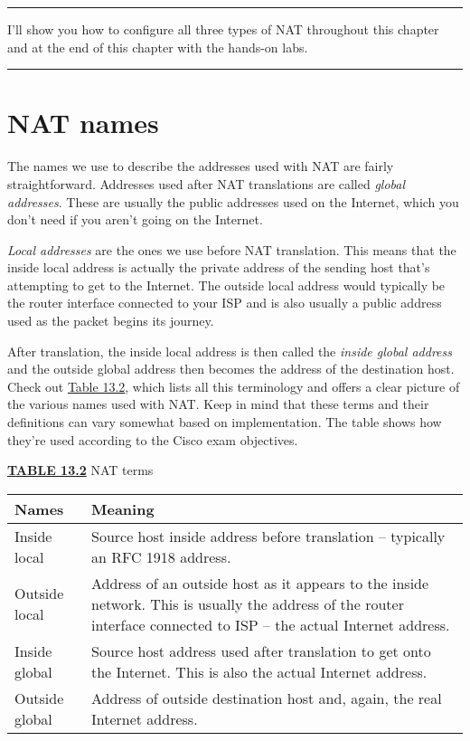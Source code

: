 \begin{center}\rule{0.5\linewidth}{0.5pt}\end{center}

I'll show you how to configure all three types of NAT throughout this chapter and at the end of this chapter with the hands-on labs.

\begin{center}\rule{0.5\linewidth}{0.5pt}\end{center}



\section{NAT names}

The names we use to describe the addresses used with NAT are fairly
straightforward. Addresses used after NAT translations are called
\emph{global addresses}. These are usually the public addresses used on
the Internet, which you don't need if you aren't going on the Internet.

\emph{Local addresses} are the ones we use before NAT translation. This
means that the inside local address is actually the private address of
the sending host that's attempting to get to the Internet. The outside
local address would typically be the router interface connected to your
ISP and is also usually a public address used as the packet begins its
journey.

After translation,
the inside local address is then called the \emph{inside global address}
and the outside global address then becomes the address of the
destination host. Check out
\protect\hyperlink{c13.xhtmlux5cux23table13-2}{Table 13.2}, which lists
all this terminology and offers a clear picture of the various names
used with NAT. Keep in mind that these terms and their definitions can
vary somewhat based on implementation. The table shows how they're used
according to the Cisco exam objectives.

{\protect\hyperlink{c13.xhtmlux5cux23tableanchor13-2}{\textbf{TABLE
13.2}} NAT terms}

\begin{longtable}[]{@{}ll@{}}
\toprule
Names & Meaning\tabularnewline
\midrule
\endhead
Inside local & Source host inside address before translation -- typically
an RFC 1918 address.\tabularnewline
Outside local & Address of an outside host as it appears to the inside
network. This is usually the address of the router interface connected
to ISP -- the actual Internet address.\tabularnewline
Inside global & Source host address used after translation to get onto
the Internet. This is also the actual Internet address.\tabularnewline
Outside global & Address of outside destination host and, again, the
real Internet address.\tabularnewline
\bottomrule
\end{longtable}




